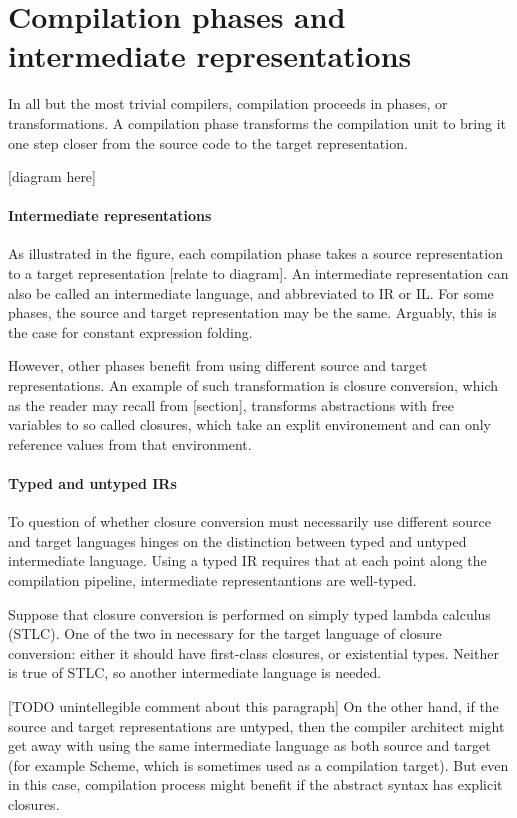 \documentclass[bsc,frontabs,oneside,singlespacing,parskip,deptreport]{infthesis}
\theoremstyle{definition}
\theoremstyle{lemma}
\begin{document}
\section{Compilation phases and intermediate representations}

In all but the most trivial compilers, compilation proceeds in
phases, or transformations. A compilation phase transforms the
compilation unit to bring it one step closer from the source code to
the target representation.

[diagram here]

\paragraph{Intermediate representations} As illustrated in the figure,
each compilation phase takes a source representation to a target
representation [relate to diagram]. An intermediate representation can
also be called an intermediate language, and abbreviated to IR or
IL. For some phases, the source and target representation may be the
same. Arguably, this is the case for constant expression folding.

However, other phases benefit from using different source and target
representations. An example of such transformation is closure
conversion, which as the reader may recall from [section], transforms
abstractions with free variables to so called closures, which take an
explit environement and can only reference values from that
environment.

\paragraph{Typed and untyped IRs} To question of whether closure
conversion must necessarily use different source and target languages
hinges on the distinction between typed and untyped intermediate
language. Using a typed IR requires that at each point along the
compilation pipeline, intermediate representantions are well-typed.

Suppose that closure conversion is performed on simply typed lambda
calculus (STLC). One of the two in necessary for the target language
of closure conversion: either it should have first-class closures, or
existential types. Neither is true of STLC, so another intermediate
language is needed.

[TODO unintellegible comment about this paragraph] On the other hand,
if the source and target representations are untyped, then the
compiler architect might get away with using the same intermediate
language as both source and target (for example Scheme, which is
sometimes used as a compilation target). But even in this case,
compilation process might benefit if the abstract syntax has explicit
closures.
\end{document}

